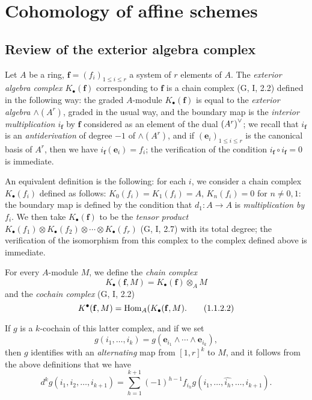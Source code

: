 \section{Cohomology of affine schemes}
\label{section:3.1}

\subsection{Review of the exterior algebra complex}
\label{subsection:3.1.1}

\begin{env}[1.1.1]
\label{3.1.1.1}
Let $A$ be a ring, $\mathbf{f}=(f_i)_{1\leq i\leq r}$ a system of $r$ elements of $A$.
The \emph{exterior algebra complex $K_\bullet(\mathbf{f})$} corresponding to $\mathbf{f}$ is a chain complex (G, I, 2.2) defined in the following way: the graded $A$-module $K_\bullet(\mathbf{f})$ is equal to the \emph{exterior algebra $\wedge(A^r)$}, graded in the usual way, and the boundary map is the \emph{interior multiplication $i_\mathbf{f}$} by $\mathbf{f}$ considered as an element of the dual ${(A^r)}^\vee$; we recall that $i_\mathbf{f}$ is an \emph{antiderivation} of degree $-1$ of $\wedge(A^r)$, and if $(\mathbf{e}_i)_{1\leq i\leq r}$ is the canonical basis of $A^r$, then we have $i_\mathbf{f}(\mathbf{e}_i)=f_i$; the verification of the condition $i_\mathbf{f}\circ i_\mathbf{f}=0$ is immediate.

An equivalent definition is the following: for each $i$, we consider a chain complex $K_\bullet(f_i)$ defined as follows: $K_0(f_i)=K_1(f_i)=A$, $K_n(f_i)=0$ for $n\neq 0,1$: the boundary map is defined by the condition that $d_1:A\to A$ is \emph{multiplication by $f_i$}.
We then take $K_\bullet(\mathbf{f})$ to be the \emph{tensor product $K_\bullet(f_1)\otimes K_\bullet(f_2)\otimes\cdots\otimes K_\bullet(f_r)$} (G, I, 2.7) with its total degree; the verification of the isomorphism from this complex to the complex defined above is immediate.
\end{env}

\begin{env}[1.1.2]
\label{3.1.1.2}
For every $A$-module $M$, we define the \emph{chain complex}
\[
\label{3.1.1.2.1}
  K_\bullet(\mathbf{f},M)=K_\bullet(\mathbf{f})\otimes_A M
  \tag{1.1.2.1}
\]
and the \emph{cochain complex} (G, I, 2.2)
\[
\label{3.1.1.2.2}
  K^\bullet(\mathbf{f},M)=\operatorname{Hom}_A(K_\bullet(\mathbf{f},M).
  \tag{1.1.2.2}
\]

If $g$ is a $k$-cochain of this latter complex, and if we set
\[
  g(i_1,\dots,i_k)=g(\mathbf{e}_{i_1}\wedge\cdots\wedge\mathbf{e}_{i_k}),
\]
then $g$ identifies with an \emph{alternating} map from $[1,r]^k$ to $M$, and it follows from the above definitions that we have
\[
\label{3.1.1.2.3}
  d^k g(i_1,i_2,\dots,i_{k+1})=\sum_{h=1}^{k+1}(-1)^{h-1}f_{i_h}g(i_1,\dots,\widehat{i_h},\dots,i_{k+1}).
  \tag{1.1.2.3}
\]
\end{env}

